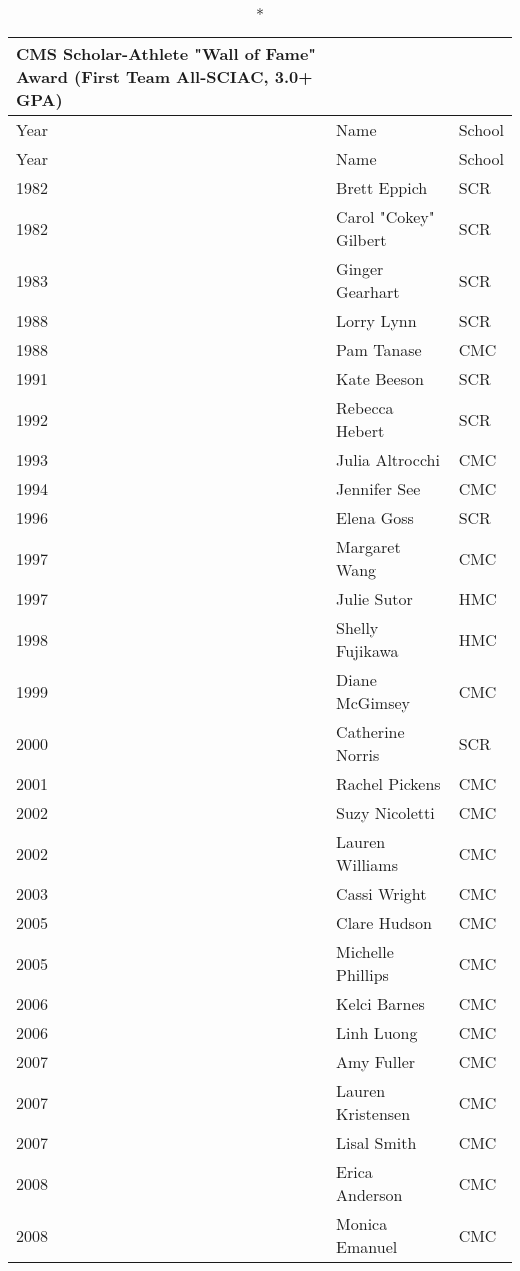 \clearpage
\begin{longtable}{l l l}
    \caption*{CMS Scholar-Athlete "Wall of Fame" Award (First Team All-SCIAC, 3.0+ GPA)} \\
    \toprule
    Year & Name & School \\
    \midrule
    \endfirsthead
    
    \toprule
    Year & Name & School \\
    \midrule
    \endhead
    
    \bottomrule
    \endfoot
    
    1982 & Brett Eppich & SCR \\
    1982 & Carol "Cokey" Gilbert & SCR \\
    1983 & Ginger Gearhart & SCR \\
    1988 & Lorry Lynn & SCR \\
    1988 & Pam Tanase & CMC \\
    1991 & Kate Beeson & SCR \\
    1992 & Rebecca Hebert & SCR \\
    1993 & Julia Altrocchi & CMC \\
    1994 & Jennifer See & CMC \\
    1996 & Elena Goss & SCR \\
    1997 & Margaret Wang & CMC \\
    1997 & Julie Sutor & HMC \\
    1998 & Shelly Fujikawa & HMC \\
    1999 & Diane McGimsey & CMC \\
    2000 & Catherine Norris & SCR \\
    2001 & Rachel Pickens & CMC \\
    2002 & Suzy Nicoletti & CMC \\
    2002 & Lauren Williams & CMC \\
    2003 & Cassi Wright & CMC \\
    2005 & Clare Hudson & CMC \\
    2005 & Michelle Phillips & CMC \\
    2006 & Kelci Barnes & CMC \\
    2006 & Linh Luong & CMC \\
    2007 & Amy Fuller & CMC \\
    2007 & Lauren Kristensen & CMC \\
    2007 & Lisal Smith & CMC \\
    2008 & Erica Anderson & CMC \\
    2008 & Monica Emanuel & CMC \\

\end{longtable}
